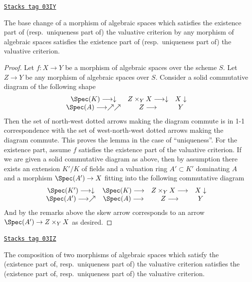 \begin{lemma}
\label{spaces-morphisms-lemma-base-change-valuative-criteria}
\href{https://stacks.math.columbia.edu/tag/03IY}{\texttt{Stacks tag 03IY}}

The base change of a morphism of algebraic spaces which satisfies the
existence part of (resp.\ uniqueness part of) the valuative criterion
by any morphism of algebraic spaces satisfies the
existence part of (resp.\ uniqueness part of) the valuative criterion.
\end{lemma}

\begin{proof}
Let $f : X \to Y$ be a morphism of algebraic spaces over the scheme $S$.
Let $Z \to Y$ be any morphism of algebraic spaces over $S$.
Consider a solid commutative diagram of the following shape
$$
\begin{array}{ccc}\Spec(K) \longrightarrow\downarrow & Z \times_Y X \longrightarrow\downarrow & X \downarrow \\ \Spec(A) \longrightarrow\nearrow\nearrow & Z \longrightarrow & Y\end{array}
$$
Then the set of north-west dotted arrows making the diagram commute
is in 1-1 correspondence with the set of west-north-west dotted arrows
making the diagram commute. This proves the lemma in the case of
``uniqueness''. For the existence part, assume $f$ satisfies the existence
part of the valuative criterion. If we are given a solid commutative
diagram as above, then by assumption there exists an extension $K'/K$
of fields and a valuation ring $A' \subset K'$ dominating $A$ and
a morphism $\Spec(A') \to X$ fitting into the following commutative
diagram
$$
\begin{array}{cccc}\Spec(K') \longrightarrow\downarrow & \Spec(K) \longrightarrow & Z \times_Y X \longrightarrow & X \downarrow \\ \Spec(A') \longrightarrow\nearrow & \Spec(A) \longrightarrow & Z \longrightarrow & Y\end{array}
$$
And by the remarks above the skew arrow corresponds to an arrow
$\Spec(A') \to Z \times_Y X$ as desired.
\end{proof}

\begin{lemma}
\label{spaces-morphisms-lemma-composition-valuative-criteria}
\href{https://stacks.math.columbia.edu/tag/03IZ}{\texttt{Stacks tag 03IZ}}

The composition of two morphisms of algebraic spaces which satisfy the
(existence part of, resp.\ uniqueness part of) the valuative criterion
satisfies the (existence part of, resp.\ uniqueness part of) the valuative
criterion.
\end{lemma}

